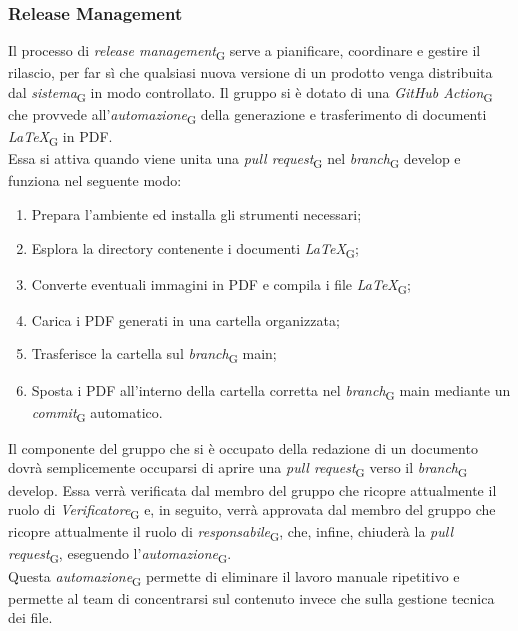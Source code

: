 \subsubsection{Release Management}
Il processo di \textit{release management}\textsubscript{G} serve a pianificare, coordinare e gestire il rilascio, per far sì che qualsiasi nuova versione di un prodotto venga distribuita dal \textit{sistema}\textsubscript{G} in modo controllato.
Il gruppo si è dotato di una \textit{GitHub Action}\textsubscript{G} che provvede all'\textit{automazione}\textsubscript{G} della generazione e trasferimento di documenti \textit{LaTeX}\textsubscript{G} in PDF.\\
Essa si attiva quando viene unita una \textit{pull request}\textsubscript{G} nel \textit{branch}\textsubscript{G} develop e funziona nel seguente modo: 
\begin{enumerate}
    \item Prepara l'ambiente ed installa gli strumenti necessari;
    \item Esplora la directory contenente i documenti \textit{LaTeX}\textsubscript{G};
    \item Converte eventuali immagini in PDF e compila i file \textit{LaTeX}\textsubscript{G};
    \item Carica i PDF generati in una cartella organizzata;
    \item Trasferisce la cartella sul \textit{branch}\textsubscript{G} main;
    \item Sposta i PDF all'interno della cartella corretta nel  \textit{branch}\textsubscript{G} main mediante un \textit{commit}\textsubscript{G} automatico.
\end{enumerate}
Il componente del gruppo che si è occupato della redazione di un documento dovrà semplicemente occuparsi di aprire una \textit{pull request}\textsubscript{G} verso il \textit{branch}\textsubscript{G} develop. Essa verrà verificata dal membro del gruppo che ricopre attualmente il ruolo di \textit{Verificatore}\textsubscript{G} e, in seguito, verrà approvata dal membro del gruppo che ricopre attualmente il ruolo di \textit{responsabile}\textsubscript{G}, che, infine, chiuderà la \textit{pull request}\textsubscript{G}, eseguendo l'\textit{automazione}\textsubscript{G}.\\
Questa \textit{automazione}\textsubscript{G} permette di eliminare il lavoro manuale ripetitivo e permette al team di concentrarsi sul contenuto invece che sulla gestione tecnica dei file.